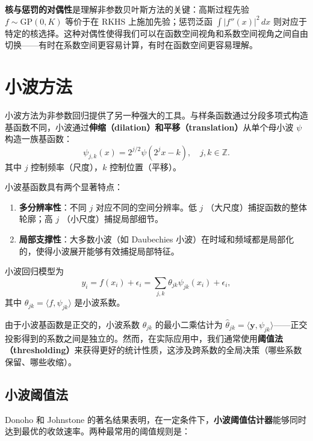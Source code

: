 \textbf{核与惩罚的对偶性}是理解非参数贝叶斯方法的关键：高斯过程先验 $f \sim \mathrm{GP}(0, K)$ 等价于在 RKHS 上施加先验；惩罚泛函 $\int |f''(x)|^2\, dx$ 则对应于特定的核选择。这种对偶性使得我们可以在函数空间视角和系数空间视角之间自由切换——有时在系数空间更容易计算，有时在函数空间更容易理解。

\section{小波方法}\label{sec:wavelet-methods}

小波方法为非参数回归提供了另一种强大的工具。与样条函数通过分段多项式构造基函数不同，小波通过\textbf{伸缩（dilation）和平移（translation）}从单个母小波 $\psi$ 构造一族基函数：
\begin{equation}
\psi_{j,k}(x) = 2^{j/2} \psi(2^j x - k),\quad j, k \in \mathbb{Z}.
\label{eq:wavelet-basis}
\end{equation}
其中 $j$ 控制频率（尺度），$k$ 控制位置（平移）。

小波基函数具有两个显著特点：
\begin{enumerate}
\item \textbf{多分辨率性}：不同 $j$ 对应不同的空间分辨率。低 $j$ （大尺度）捕捉函数的整体轮廓；高 $j$ （小尺度）捕捉局部细节。
\item \textbf{局部支撑性}：大多数小波（如 Daubechies 小波）在时域和频域都是局部化的，使得小波展开能够有效捕捉局部特征。
\end{enumerate}

小波回归模型为
\begin{equation}
y_i = f(x_i) + \epsilon_i = \sum_{j,k} \theta_{jk} \psi_{jk}(x_i) + \epsilon_i,
\label{eq:wavelet-regression-model}
\end{equation}
其中 $\theta_{jk} = \langle f, \psi_{jk} \rangle$ 是小波系数。

由于小波基函数是正交的，小波系数 $\theta_{jk}$ 的最小二乘估计为 $\hat{\theta}_{jk} = \langle \mathbf{y}, \psi_{jk} \rangle$——正交投影得到的系数之间是独立的。然而，在实际应用中，我们通常使用\textbf{阈值法（thresholding）}来获得更好的统计性质，这涉及跨系数的全局决策（哪些系数保留、哪些收缩）。

\subsection{小波阈值法}\label{sec:wavelet-thresholding}

Donoho 和 Johnstone 的著名结果表明，在一定条件下，\textbf{小波阈值估计器}能够同时达到最优的收敛速率。两种最常用的阈值规则是：

